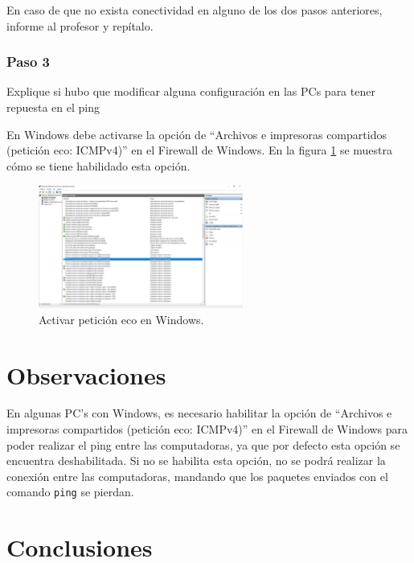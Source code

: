         En caso de que no exista conectividad en alguno de los dos pasos anteriores, informe al profesor y repítalo. 

        \subsubsection*{Paso 3}
        Explique si hubo que modificar alguna configuración en las PCs para tener repuesta en el ping

        En Windows debe activarse la opción de ``Archivos e impresoras compartidos (petición eco: ICMPv4)'' en el Firewall de Windows. En la figura \ref{fig:activar_ping} se muestra cómo se tiene habilidado esta opción.

        \begin{figure}[H]
            \centering
            \includegraphics[width=0.6\textwidth]{img/firewall.jpg}
            \caption{Activar petición eco en Windows.}
            \label{fig:activar_ping}
        \end{figure}

\section{Observaciones}

    En algunas PC's con Windows, es necesario habilitar la opción de ``Archivos e impresoras compartidos (petición eco: ICMPv4)'' en el Firewall de Windows para poder realizar el ping entre las computadoras, ya que por defecto esta opción se encuentra deshabilitada. Si no se habilita esta opción, no se podrá realizar la conexión entre las computadoras, mandando que los paquetes enviados con el comando \texttt{ping} se pierdan.

\section{Conclusiones}

